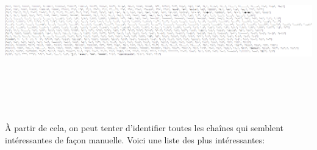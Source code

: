 \includegraphics[width=\linewidth,height=7cm]{images/analyse_list_car_speciaux}

À partir de cela, on peut tenter d'identifier toutes les chaînes qui semblent intéressantes de façon manuelle. Voici une liste des plus intéressantes: 

